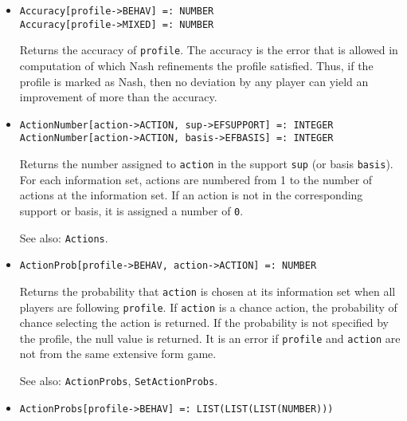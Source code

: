 \begin{itemize}




\item{}
\protect \large \begin{verbatim}
Accuracy[profile->BEHAV] =: NUMBER
Accuracy[profile->MIXED] =: NUMBER
\end{verbatim}\normalsize

\bd 
Returns the accuracy of \verb+profile+.  The accuracy is the error
that is allowed in computation of which Nash refinements the profile
satisfied.  Thus, if the profile is marked as Nash, then no deviation
by any player can yield an improvement of more than the accuracy.  
\ed

\item{}
\protect \large \begin{verbatim}
ActionNumber[action->ACTION, sup->EFSUPPORT] =: INTEGER 
ActionNumber[action->ACTION, basis->EFBASIS] =: INTEGER
\end{verbatim}\normalsize

\bd
Returns the number
assigned to \verb+action+ in the support \verb+sup+ (or basis
\verb+basis+).  For each information set, actions are numbered from 1
to the number of actions at the information set.  If an action is not
in the corresponding support or basis, it is assigned a number of \verb+0+.  

\item [See also:] \verb+Actions+.
\ed

\item{}
\protect \large \begin{verbatim}
ActionProb[profile->BEHAV, action->ACTION] =: NUMBER 
\end{verbatim}\normalsize

\bd
Returns the probability that \verb+action+ is chosen at its
information set when all players are following \verb+profile+.
If \verb+action+ is a chance action, the probability of chance selecting
the action is returned.  If the probability is not specified by the 
profile, the null value is returned.  It is an error if \verb+profile+
and \verb+action+ are not from the same extensive form game.

\item [See also:] \verb+ActionProbs+, \verb+SetActionProbs+.
\ed

\item{}
\protect \large \begin{verbatim}
ActionProbs[profile->BEHAV] =: LIST(LIST(LIST(NUMBER))) 
\end{verbatim}\normalsize


\end{itemize}
